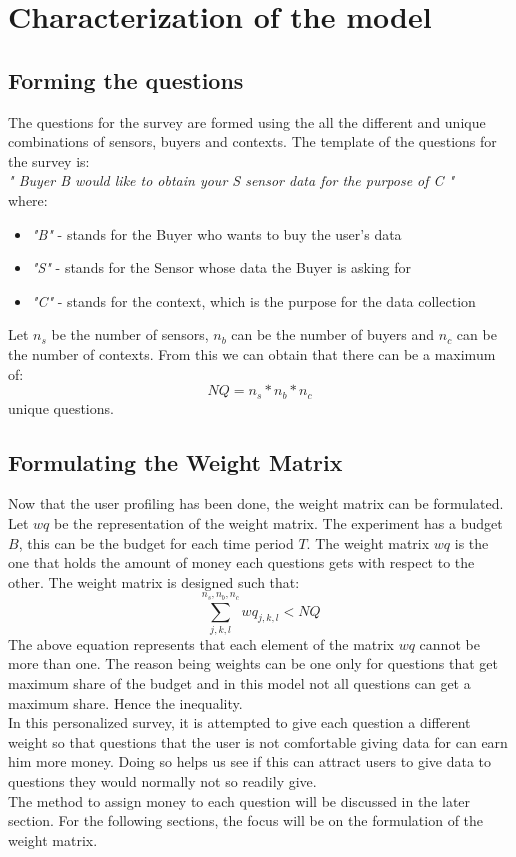 \section{Characterization of the model}


\subsection{Forming the questions}

The questions for the survey are formed using the all the different and unique combinations of sensors, buyers and contexts. The template of the questions for the survey is:\\
{\it " Buyer B would like to obtain your S sensor data for the purpose of C "}\\
where:
\begin{itemize}
\item {\it "B"} - stands for the Buyer who wants to buy the user's data
\item {\it "S"} - stands for the Sensor whose data the Buyer is asking for
\item {\it "C"} - stands for the context, which is the purpose for the data collection
\end{itemize}

Let $n_s$ be the number of sensors, $n_b$ can be the number of buyers and $n_c$ can be the number of contexts. From this we
can obtain that there can be a maximum of:
$$NQ = n_s*n_b*n_c$$ 
unique questions.

\subsection{Formulating the Weight Matrix}

Now that the user profiling has been done, the weight matrix can be formulated. Let $wq$ be the representation of the weight matrix. The experiment has a budget $B$, this can be the budget for each time period $T$.
The weight matrix $wq$ is the one that holds the amount of money each questions gets with respect to the other. The weight matrix is
designed such that:
$$\sum^{n_s,n_b,n_c}_{j,k,l} wq_{j,k,l} < NQ$$ 
The above equation represents that each element of the matrix $wq$ cannot be more than one. The reason being
weights can be one only for questions that get maximum share of the budget and in this model
not all questions can get a maximum share. Hence the inequality.\\
In this personalized survey, it is attempted to give each question a different
weight so that questions that the user is not comfortable giving data for can earn him more money. Doing so helps us see if this can attract users to give data to questions they would normally not so readily give.\\
The method to assign money to each question will be discussed in the later section. For the following sections, the focus
will be on the formulation of the weight matrix. 

